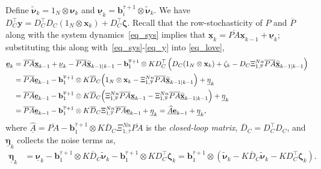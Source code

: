 \documentclass[journal]{IEEEtran}
\def\mb{\mathbf}
\begin{document}
\begin{strip}
Define $\widetilde{\mb{\nu}}_{k} =  1_{N} \otimes \mb{\nu}_{k} $
and $\underline{\mb{\nu}}_{k} =\mb{b}^{\overline{\tau}+1}_i \otimes\widetilde{\mb{\nu}}_{k}$. 
We have $D_C^\top \mb{y} =D_C^\top D_C(1_{N} \otimes\mb{x}_k)+  D_C^\top \mb{\zeta} $. 
Recall that the row-stochasticity of $P$ and $\overline{P}$ along with the system dynamics~\eqref{eq_sys} implies that $\underline{\mb{x}}_{k}   = \overline{PA} \underline{\mb{x}}_{k-1} +  \underline{\mb{\nu}}_{k}  $; substituting this  along with~\eqref{eq_sys}-\eqref{eq_y} into \eqref{eq_love},
\begin{align}
	\underline{\mb{e}}_{k} &= \overline{PA} \underline{\mb{x}}_{k-1} + \underline{\mb{\nu}}_{k} -  \overline{PA}\underline{\widehat{\mb{x}}}_{k-1|k-1} -  \mb{b}^{\overline{\tau}+1}_1 \otimes K D_C^\top \left(D_C(1_{N} \otimes\mb{x}_k)+  \mb{\zeta}_{k}-D_C\Xi^{Nn}_{1,\overline{\tau}}\overline{PA}\underline{\widehat{\mb{x}}}_{k-1|k-1}\right) \nonumber \\
	&= \overline{PA} \underline{\mb{e}}_{k-1} 
	- \mb{b}^{\overline{\tau}+1}_1 \otimes K \overline{D}_C \Bigl(1_{N} \otimes\mb{x}_{k}  
	- \Xi^{Nn}_{1,\overline{\tau}}\overline{PA}\underline{\widehat{\mb{x}}}_{k-1|k-1}\Bigr) + \underline{\mb{\eta}}_k \nonumber  \\
	&= \overline{PA} \underline{\mb{e}}_{k-1} 
	- \mb{b}^{\overline{\tau}+1}_1 \otimes K \overline{D}_C \Bigl(\Xi^{Nn}_{1,\overline{\tau}}\overline{PA}\underline{\mb{x}}_{k-1}  
	- \Xi^{Nn}_{1,\overline{\tau}}\overline{PA}\underline{\widehat{\mb{x}}}_{k-1|k-1}\Bigr) + \underline{\mb{\eta}}_k \nonumber  \\
	&= \overline{PA} \underline{\mb{e}}_{k-1} 
	- \mb{b}^{\overline{\tau}+1}_1 \otimes K \overline{D}_C \Xi^{Nn}_{1,\overline{\tau}}\overline{PA}\underline{\mb{e}}_{k-1}  + \underline{\mb{\eta}}_k   = \underline{\widehat{A}} \underline{\mb{e}}_{k-1}  + \underline{\mb{\eta}}_k, \label{eq_err1}
\end{align}
where $\underline{\widehat{A}}= \overline{PA}
- \mb{b}^{\overline{\tau}+1}_1 \otimes K \overline{D}_C \Xi^{Nn}_{1,\overline{\tau}}\overline{PA}$ is the \textit{closed-loop matrix}, $\overline{D}_C= D_C^\top D_C$, and $\underline{\mb{\eta}}_k$ collects the noise terms as,
\begin{align}
	\underline{\mb{\eta}}_k &= \underline{\mb{\nu}}_{k} - \mb{b}^{\overline{\tau}+1}_1 \otimes K \overline{D}_C\widetilde{\mb{\nu}}_{k} -\mb{b}^{\overline{\tau}+1}_1\otimes  K {D}_C^\top\mb{\zeta}_{k} =  \mb{b}^{\overline{\tau}+1}_1 \otimes (\widetilde{\mb{\nu}}_{k} - K \overline{D}_C\widetilde{\mb{\nu}}_{k} - K {D}_C^\top\mb{\zeta}_{k}).
	\label{eq_eta}
\end{align}
\end{strip}
\end{document}
